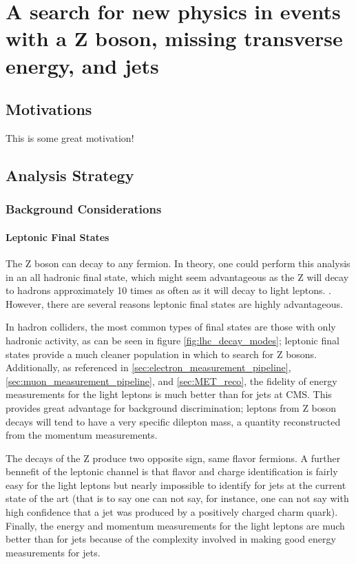 \chapter{A search for new physics in events with a Z boson, missing transverse energy, and jets}

\section{Motivations}

This is some great motivation!

\section{Analysis Strategy}

\subsection{Background Considerations}

\subsubsection{Leptonic Final States}
The Z boson can decay to any fermion. In theory, one could perform this analysis in an all hadronic final state, which might seem advantageous as the Z will decay to hadrons approximately 10 times as often as it will decay to light leptons. . However, there are several reasons leptonic final states are highly advantageous.

In hadron colliders, the most common types of final states are those with only hadronic activity, as can be seen in figure \ref{fig:lhc_decay_modes}; leptonic final states provide a much cleaner population in which to search for Z bosons. Additionally, as referenced in \ref{sec:electron_measurement_pipeline}, \ref{sec:muon_measurement_pipeline}, and \ref{sec:MET_reco}, the fidelity of energy measurements for the light leptons is much better than for jets at CMS. This provides great advantage for background discrimination; leptons from Z boson decays will tend to have a very specific dilepton mass, a quantity reconstructed from the momentum measurements.

The decays of the Z produce two opposite sign, same flavor fermions. A further bennefit of the leptonic channel is that flavor and charge identification is fairly easy for the light leptons but nearly impossible to identify for jets at the current state of the art (that is to say one can not say, for instance, one can not say with high confidence that a jet was produced by a positively charged charm quark). Finally, the energy and momentum measurements for the light leptons are much better than for jets because of the complexity involved in making good energy measurements for jets.  

